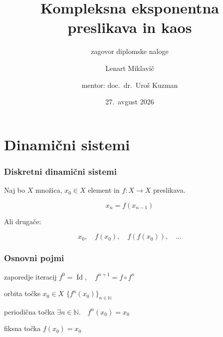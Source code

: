 \documentclass[]{beamer}
\title{Kompleksna eksponentna preslikava in kaos}
\subtitle{zagovor diplomske naloge}
\author[Lenart Miklavič]{Lenart Miklavič \and mentor: doc.~dr.~Uroš Kuzman}
\institute[FMF]{Fakulteta za matematiko in fiziko}
\date{27.~avgust 2026}
\theoremstyle{definition}
\theoremstyle{plain}
\begin{document}
\maketitle

\section{Dinamični sistemi}

\begin{frame}
  \frametitle{Diskretni dinamični sistemi}

  Naj bo \(X\) množica, \(x_0 \in X\) element in \(f \colon X \to X\) preslikava.

  \[x_n = f (x_{n - 1})\]

  Ali drugače:

  \[x_0, \quad f (x_0), \quad f (f (x_0)), \quad \ldots\]


\end{frame}


\begin{frame}
  \frametitle{Osnovni pojmi}

  \begin{block}{zaporedje iteracij}
    \centering \(\displaystyle f^0 = \operatorname{Id}, \quad f^{n + 1} = f \circ f^n\)
  \end{block}
  \begin{block}{orbita točke \(x_0 \in X\)}
    \centering \(\displaystyle \big\{ f^n (x_0) \big\}_{n \in \mathbb{N}}\)
  \end{block}
  \begin{block}{periodična točka}
    \centering \(\exists n \in \mathbb{N}. \quad f^n (x_0) = x_0\)
  \end{block}
  \begin{block}{fiksna točka}
    \centering \(f (x_0) = x_0\)
  \end{block}

\end{frame}
\end{document}
